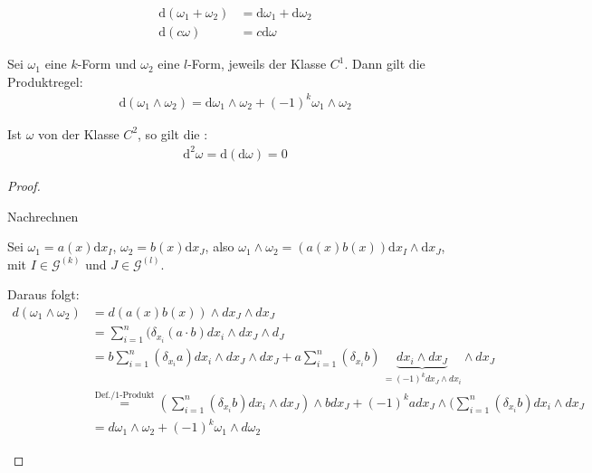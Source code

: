 \begin{theorem}[Satz] \label{8.5}
  \begin{enum-arab}
  \item
    \begin{align*}
      \mathrm d(\omega_1 + \omega_2) &= \mathrm d \omega_1 + \mathrm d \omega_2 \\
      \mathrm d(c \omega) &= c \mathrm d \omega
    \end{align*}
  \item
    Sei $\omega_1$ eine $k$-Form und $\omega_2$ eine $l$-Form, jeweils der Klasse $C^1$.
    Dann gilt die Produktregel:
    \begin{align*}
      \mathrm d (\omega_1 \wedge \omega_2) = \mathrm d \omega_1 \wedge \omega_2 + (-1)^k \omega_1 \wedge \omega_2
    \end{align*}
  \item
    Ist $\omega$ von der Klasse $C^2$, so gilt die :
    \begin{align*}
      \mathrm d^2 \omega = \mathrm d(\mathrm d \omega) = 0
    \end{align*}
  \end{enum-arab}
  \begin{proof}
    \begin{enum-arab}
    \item
      Nachrechnen
    \item
      Sei $\omega_1 = a(x) \mathrm d x_I$, $\omega_2 = b(x) \mathrm d x_J$, also $\omega_1 \wedge \omega_2 = (a(x)b(x)) \mathrm d x_I \wedge \mathrm d x_J$, mit $I \in \mathcal G^{(k)}$ und $J \in \mathcal G^{(l)}$.
    \item
      Daraus folgt:
      \begin{align*}
        d(\omega_1 \land \omega_2)&=d(a(x) b(x))\wedge dx_J \wedge dx_J\\
        &= \sum_{i=1}^n(\delta_{x_i}(a\cdot b) dx_i \wedge dx_J \wedge d_J\\
        &= b\sum_{i=1}^n(\delta_{x_i} a) dx_i \wedge dx_J \wedge dx_J + a \sum_{i=1}^n (\delta_{x_i} b)\, \underbrace{dx_i \wedge dx_J}_{=(-1)^k dx_J \wedge dx_i}  \wedge dx_J \\
        &\stackrel{\text{Def./1-Produkt}}=(\sum_{i=1}^n(\delta_{x_i}b) dx_i \wedge dx_J)\wedge bdx_J + (-1)^k a dx_J \wedge(\sum_{i=1}^n(\delta_{x_i} b) dx_i \wedge dx_J \\
        &= d\omega_1 \wedge \omega_2+(-1)^k \omega_1 \wedge d\omega_2
      \end{align*}

\end{enum-arab}
\end{proof}
\end{theorem}
